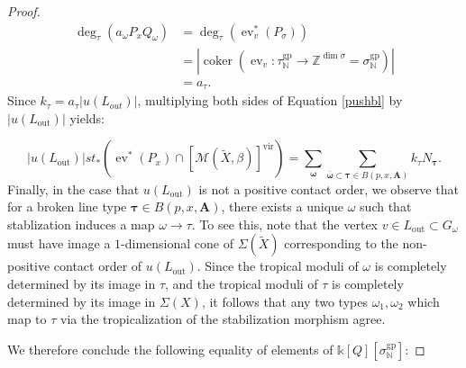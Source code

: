\documentclass[12pt, oneside]{amsart}   	%
\newcommand{\NN}{\mathbb{N}}
\newcommand{\ZZ}{\mathbb{Z}}
\newcommand{\kk}{\mathds{k}}
\newcommand{\vir}{\operatorname{vir}}
\newcommand{\ev}{\operatorname{ev}}
\newcommand{\gp}{\operatorname{gp}}
\newcommand{\out}{\operatorname{out}}
\newcommand{\coker}{\operatorname{coker}}
\numberwithin{equation}{section}
\numberwithin{thm}{section}
\numberwithin{figure}{section}
\begin{document}
\begin{proof}
\begin{equation}\label{blmult}
\begin{split}
\deg_{\tau}(a_\omega P_xQ_{\omega}) &= \deg_{\tau}(\ev_v^*(P_\sigma)) \\
&= |\coker(\ev_v: \tau^{\gp}_{\NN} \rightarrow \ZZ^{\dim \sigma} = \sigma^{\gp}_{\NN})| \\
&= a_{\tau}.
\end{split}
\end{equation}
Since $k_{\tau} = a_{\tau}|u(L_{out})|$, multiplying both sides of Equation \ref{pushbl} by $|u(L_{\out})|$ yields:
 
 \begin{equation}
|u(L_{\out})| st_*(\ev^*(P_x)\cap[\mathscr{M}(\widetilde{X},\beta)]^{\vir}) = \sum_{\pmb\omega}\sum_{\overline{\pmb\omega} \subset \pmb\tau \in B(p,x,\textbf{A})} k_{\tau}N_{\pmb\tau} .
 \end{equation}
Finally, in the case that $u(L_{\out})$ is not a positive contact order, we observe that for a broken line type $\pmb\tau \in B(p,x,\textbf{A})$, there exists a unique $\omega$ such that stablization induces a map $\omega \rightarrow \tau$. To see this, note that the vertex $v \in L_{\out} \subset G_{\omega}$ must have image a $1$-dimensional cone of $\Sigma(\widetilde{X})$ corresponding to the non-positive contact order of $u(L_{\out})$. Since the tropical moduli of $\omega$ is completely determined by its image in $\tau$, and the tropical moduli of $\tau$ is completely determined by its image in $\Sigma(X)$, it follows that any two types $\omega_1,\omega_2$ which map to $\tau$ via the tropicalization of the stabilization morphism agree. 

 We therefore conclude the following equality of elements of $\kk[Q][\sigma_{\NN}^{\gp}]$:
 

\end{proof}
\end{document}
